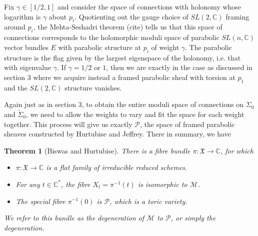 \documentclass[]{article}
\newtheorem{theorem}{Theorem}
\newcommand{\C}{\mathbb{C}}
\newcommand{\MM}{\mathcal{M}}
\newcommand{\cP}{\mathcal{P}}
\newcommand{\XX}{\mathfrak{X}}
\begin{document}
	Fix $\gamma \in [1/2,1]$ and consider the space of connections with holonomy whose logarithm is $\gamma$ about $p_i$. Quotienting out the gauge choice of $SL(2,\C)$ framing around $p_i$, the Mehta-Seshadri theorem (cite) tells us that this space of connections corresponds to the holomorphic moduli space of parabolic $SL(n,\C)$ vector bundles $E$ with parabolic structure at $p_i$ of weight $\gamma$. The parabolic structure is the flag given by the largest eigenspace of the holonomy, i.e. that with eigenvalue $\gamma$. If $\gamma = 1/2$ or $1$, then we are exactly in the case as discussed in section 3 where we acquire instead a framed parabolic sheaf with torsion at $p_1$ and the $SL(2,\C)$ structure vanishes. 
	
	Again just as in section 3, to obtain the entire moduli space of connections on $\Sigma_0$ and $\tilde{\Sigma}_0$, we need to allow the weights to vary and fit the space for each weight together. This process will give us exactly $\cP$, the space of framed parabolic sheaves constructed by Hurtubise and Jeffrey. There in summary, we have
	\begin{theorem}[Biswas and Hurtubise]
		\label{t:bishurt}
		There is a fibre bundle $\pi: \XX \to \C$, for which
		\begin{itemize}
			\item $\pi:\XX\to \C$ is a flat family of irreducible reduced schemes.
			\item For any $t\in \C^\ast$, the fibre $X_t = \pi^{-1}(t)$ is isomorphic to $\MM$.
			\item The special fibre $\pi^{-1}(0)$ is $\cP$, which is a toric variety.
		\end{itemize}
		We refer to this bundle as the \emph{degeneration of $\MM$ to $\cP$}, or simply \emph{the degeneration}.
	\end{theorem}

	
\end{document}

